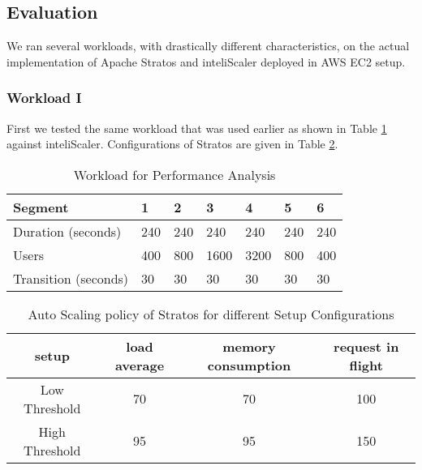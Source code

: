 \subsection{Evaluation}

We ran several workloads, with drastically different characteristics, on the actual implementation of Apache Stratos and inteliScaler deployed in AWS EC2 setup.

\subsubsection{Workload I}
First we tested the same workload that was used earlier as shown in Table \ref{table:analysis_workload} against inteliScaler. Configurations of Stratos are given in Table \ref{table:policy_threshold}.

\begin{table}[h!]
\centering
\caption{Workload for Performance Analysis}
\label{table:analysis_workload}
\begin{tabular}{|l|l|l|l|l|l|l|}
\hline
Segment & 1 & 2 & 3 & 4 & 5 & 6\\ \hline
Duration (seconds) & 240 & 240 & 240 & 240 & 240 & 240 \\ \hline
Users & 400 & 800 & 1600 & 3200 & 800 & 400   \\ \hline
Transition (seconds) & 30 & 30 & 30 & 30 & 30 & 30 \\ \hline
\end{tabular}
\end{table}

\begin{table}[h!]
\centering
\caption{Auto Scaling policy of Stratos for different Setup Configurations}
\label{table:policy_threshold}
\begin{tabular}{|c|c|c|c|}
\hline
setup & load average & memory consumption & request in flight \\ \hline
Low Threshold & 70 & 70 & 100\\ \hline
High Threshold & 95 & 95 & 150\\ \hline
\end{tabular}
\end{table}
